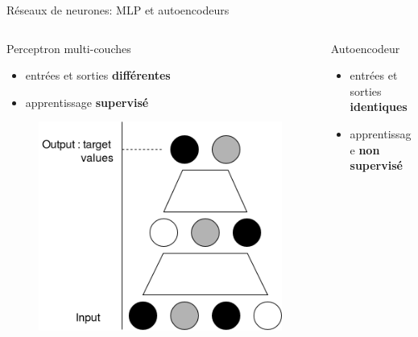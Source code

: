 \documentclass[hyperref={pdfpagelabels=false}]{beamer}
\begin{document}
    \begin{frame}{Réseaux de neurones: MLP et autoencodeurs}
        \begin{columns}
            \begin{column}{0.5\textwidth}
                Perceptron multi-couches
                \begin{itemize}
                    \item entrées et sorties \textbf{différentes}
                    \item apprentissage \textbf{supervisé}
                \end{itemize}
                \begin{figure}[h]
                    \centering
                    \includegraphics[scale=.18]{mlp}
                \end{figure}
            \end{column}
            \begin{column}{0.5 \textwidth}
                Autoencodeur
                \begin{itemize}
                    \item entrées et sorties \textbf{identiques}
                    \item apprentissage \textbf{non supervisé}
                \end{itemize}
                \begin{figure}[h]
                    \centering

\end{figure}
\end{column}
\end{columns}
\end{frame}
\end{document}
